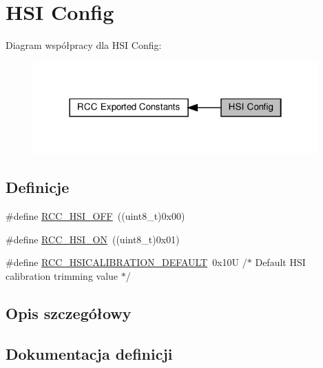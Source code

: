 \hypertarget{group___r_c_c___h_s_i___config}{}\section{H\+SI Config}
\label{group___r_c_c___h_s_i___config}
Diagram współpracy dla H\+SI Config\+:\nopagebreak
\begin{figure}[H]
\begin{center}
\leavevmode
\includegraphics[width=310pt]{group___r_c_c___h_s_i___config}
\end{center}
\end{figure}
\subsection*{Definicje}
\begin{DoxyCompactItemize}
\item 
\#define \hyperlink{group___r_c_c___h_s_i___config_ga1b34d37d3b51afec0758b3ddc7a7e665}{R\+C\+C\+\_\+\+H\+S\+I\+\_\+\+O\+FF}~((uint8\+\_\+t)0x00)
\item 
\#define \hyperlink{group___r_c_c___h_s_i___config_ga0bf09ef9e46d5da25cced7b3122f92f5}{R\+C\+C\+\_\+\+H\+S\+I\+\_\+\+ON}~((uint8\+\_\+t)0x01)
\item 
\#define \hyperlink{group___r_c_c___h_s_i___config_ga03cf582e263fb7e31a7783d8adabd7a0}{R\+C\+C\+\_\+\+H\+S\+I\+C\+A\+L\+I\+B\+R\+A\+T\+I\+O\+N\+\_\+\+D\+E\+F\+A\+U\+LT}~0x10\+U         /$\ast$ Default H\+S\+I calibration trimming value $\ast$/
\end{DoxyCompactItemize}


\subsection{Opis szczegółowy}


\subsection{Dokumentacja definicji}
\mbox{\label{group___r_c_c___h_s_i___config_ga1b34d37d3b51afec0758b3ddc7a7e665}} 
